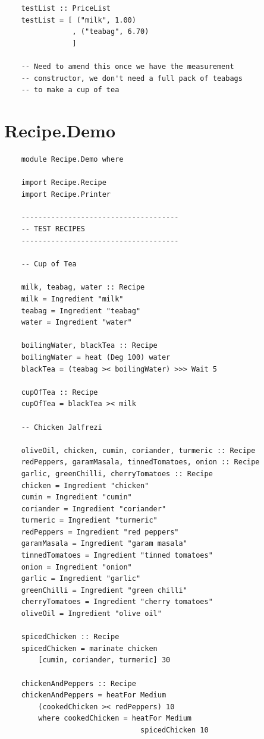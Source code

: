 \documentclass[11pt]{article}
\begin{document}
\begin{tt}
\begin{lstlisting}
    testList :: PriceList
    testList = [ ("milk", 1.00)
                , ("teabag", 6.70)
                ]
    
    -- Need to amend this once we have the measurement
    -- constructor, we don't need a full pack of teabags
    -- to make a cup of tea
    \end{lstlisting}
    \end{tt}

    \section{Recipe.Demo}

    \begin{tt}
    \small
    \begin{lstlisting}
    module Recipe.Demo where
    
    import Recipe.Recipe
    import Recipe.Printer
    
    -------------------------------------
    -- TEST RECIPES
    -------------------------------------
    
    -- Cup of Tea
    
    milk, teabag, water :: Recipe
    milk = Ingredient "milk"
    teabag = Ingredient "teabag"
    water = Ingredient "water"
    
    boilingWater, blackTea :: Recipe
    boilingWater = heat (Deg 100) water
    blackTea = (teabag >< boilingWater) >>> Wait 5

    cupOfTea :: Recipe
    cupOfTea = blackTea >< milk
    
    -- Chicken Jalfrezi
    
    oliveOil, chicken, cumin, coriander, turmeric :: Recipe
    redPeppers, garamMasala, tinnedTomatoes, onion :: Recipe
    garlic, greenChilli, cherryTomatoes :: Recipe
    chicken = Ingredient "chicken"
    cumin = Ingredient "cumin"
    coriander = Ingredient "coriander"
    turmeric = Ingredient "turmeric"
    redPeppers = Ingredient "red peppers"
    garamMasala = Ingredient "garam masala"
    tinnedTomatoes = Ingredient "tinned tomatoes"
    onion = Ingredient "onion"
    garlic = Ingredient "garlic"
    greenChilli = Ingredient "green chilli"
    cherryTomatoes = Ingredient "cherry tomatoes"
    oliveOil = Ingredient "olive oil"
    
    spicedChicken :: Recipe
    spicedChicken = marinate chicken
        [cumin, coriander, turmeric] 30
    
    chickenAndPeppers :: Recipe
    chickenAndPeppers = heatFor Medium
        (cookedChicken >< redPeppers) 10
        where cookedChicken = heatFor Medium
                                spicedChicken 10
    

\end{lstlisting}
\end{tt}
\end{document}
